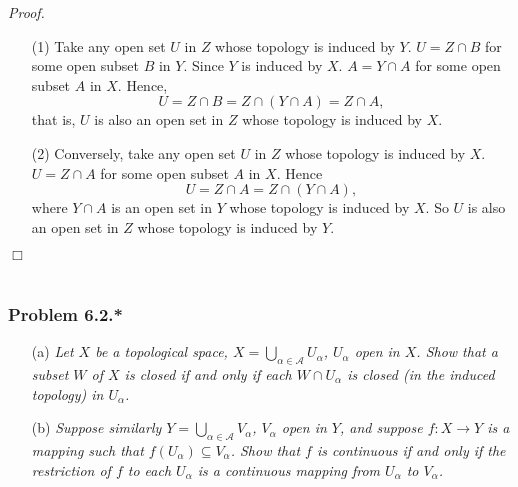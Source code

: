 \documentclass{article}
\begin{document}
\emph{Proof.}
\begin{enumerate}
\item[(1)]
  Take any open set $U$ in $Z$ whose topology is induced by $Y$.
  $U = Z \cap B$ for some open subset $B$ in $Y$.
  Since $Y$ is induced by $X$.
  $A = Y \cap A$ for some open subset $A$ in $X$.
  Hence,
  \[
    U = Z \cap B = Z \cap (Y \cap A) = Z \cap A,
  \]
  that is, $U$ is also an open set in $Z$ whose topology is induced by $X$.

\item[(2)]
  Conversely, take any open set $U$ in $Z$ whose topology is induced by $X$.
  $U = Z \cap A$ for some open subset $A$ in $X$.
  Hence
  \[
    U = Z \cap A = Z \cap (Y \cap A),
  \]
  where $Y \cap A$ is an open set in $Y$ whose topology is induced by $X$.
  So $U$ is also an open set in $Z$ whose topology is induced by $Y$.
\end{enumerate}
$\Box$ \\\\






\subsubsection*{Problem 6.2.*}
\emph{}
\begin{enumerate}
\item[(a)]
  \emph{Let $X$ be a topological space, $X = \bigcup_{\alpha \in \mathscr{A}} U_{\alpha}$,
  $U_{\alpha}$ open in $X$.
  Show that a subset $W$ of $X$ is closed if and only if
  each $W \cap U_{\alpha}$ is closed (in the induced topology) in $U_{\alpha}$.}

\item[(b)]
  \emph{Suppose similarly $Y = \bigcup_{\alpha \in \mathscr{A}} V_{\alpha}$,
  $V_{\alpha}$ open in $Y$,
  and suppose $f: X \to Y$ is a mapping such that $f(U_{\alpha}) \subseteq V_{\alpha}$.
  Show that $f$ is continuous if and only if
  the restriction of $f$ to each $U_{\alpha}$ is a continuous mapping
  from $U_{\alpha}$ to $V_{\alpha}$.} \\
\end{enumerate}
\end{document}
